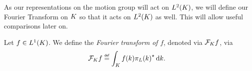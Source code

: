 As our representations on the motion group will act on $\Lebesgue{2}\CompactGroup$,
we will define our Fourier Transform on $\CompactGroup$ so that it acts on $\Lebesgue{2}\CompactGroup$ as well.
This will allow useful comparisons later on.

\begin{definition}
    Let $f \in \Lebesgue{1}\CompactGroup$.
    We define the \emph{Fourier transform of $f$}, denoted via $\Fourier[\CompactGroup] f$, via
    \begin{align*}
        \Fourier[\CompactGroup] f \defeq \int_\CompactGroup f(k) \adj{\pi_L(k)} \dd k.
    \end{align*}
\end{definition}

%
%
%
%
